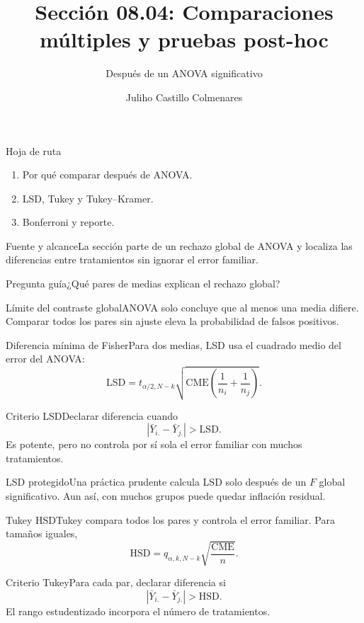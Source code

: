 \documentclass[10pt,aspectratio=169]{beamer}
\title[Comparaciones post-hoc]{Sección 08.04: Comparaciones múltiples y pruebas post-hoc}\subtitle{Después de un ANOVA significativo}
\author[J. Castillo Colmenares]{Juliho Castillo Colmenares}\institute{Tecnológico de Monterrey}\date{}
\begin{document}
\begin{frame}[plain]\titlepage\end{frame}
\begin{frame}{Hoja de ruta}\small\begin{enumerate}\item Por qué comparar después de ANOVA.\item LSD, Tukey y Tukey--Kramer.\item Bonferroni y reporte.\end{enumerate}\end{frame}
\begin{frame}{Fuente y alcance}\small La sección parte de un rechazo global de ANOVA y localiza las diferencias entre tratamientos sin ignorar el error familiar.\begin{block}{Pregunta guía}¿Qué pares de medias explican el rechazo global?\end{block}\end{frame}
\begin{frame}{Límite del contraste global}\small ANOVA solo concluye que al menos una media difiere. Comparar todos los pares sin ajuste eleva la probabilidad de falsos positivos.\end{frame}
\begin{frame}{Diferencia mínima de Fisher}\small Para dos medias, LSD usa el cuadrado medio del error del ANOVA:\[\mathrm{LSD}=t_{\alpha/2,N-k}\sqrt{\mathrm{CME}\left(\frac1{n_i}+\frac1{n_j}\right)}.\]\end{frame}
\begin{frame}{Criterio LSD}\small Declarar diferencia cuando\[|\bar Y_{i.}-\bar Y_{j.}|>\mathrm{LSD}.\]Es potente, pero no controla por sí sola el error familiar con muchos tratamientos.\end{frame}
\begin{frame}{LSD protegido}\small Una práctica prudente calcula LSD solo después de un $F$ global significativo. Aun así, con muchos grupos puede quedar inflación residual.\end{frame}
\begin{frame}{Tukey HSD}\small Tukey compara todos los pares y controla el error familiar. Para tamaños iguales,\[\mathrm{HSD}=q_{\alpha,k,N-k}\sqrt{\frac{\mathrm{CME}}n}.\]\end{frame}
\begin{frame}{Criterio Tukey}\small Para cada par, declarar diferencia si\[|\bar Y_{i.}-\bar Y_{j.}|>\mathrm{HSD}.\]El rango estudentizado incorpora el número de tratamientos.\end{frame}
\end{document}
